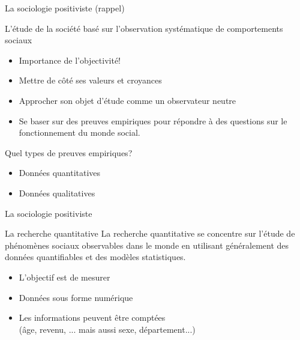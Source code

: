 \documentclass[10pt]{beamer}
\begin{document}
\begin{frame}{La sociologie positiviste (rappel)}
    \begin{block}{L'étude de la société basé sur l'observation systématique de comportements sociaux}
    \end{block}
    \begin{itemize}
        \item Importance de l'objectivité!
        \item Mettre de côté ses valeurs et croyances
        \item Approcher son objet d'étude comme un observateur neutre
        \item Se baser sur des preuves empiriques pour répondre à des questions sur le fonctionnement du monde social.
    \end{itemize}

    \begin{block}{Quel types de preuves empiriques?}
    \begin{itemize}
        \item Données quantitatives
        \item Données qualitatives
    \end{itemize}
    \end{block}
\end{frame}

\begin{frame}{La sociologie positiviste}
    \begin{block}{La recherche quantitative}
        La recherche quantitative se concentre sur l'étude de phénomènes sociaux observables dans le monde en utilisant généralement des données quantifiables et des modèles statistiques.
    \begin{itemize}
        \item L'objectif est de mesurer
        \item Données sous forme numérique
        \item Les informations peuvent être comptées \\(âge, revenu, ... mais aussi sexe, département...)
    \end{itemize}
    \end{block}

\end{frame}
\end{document}
